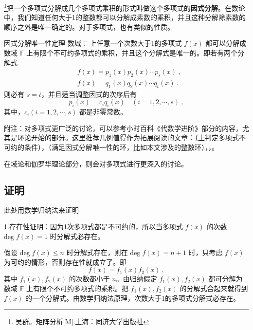 
\footnote{吴群。矩阵分析[M].上海：同济大学出版社}把一个多项式分解成几个多项式乘积的形式叫做这个多项式的\textbf{因式分解}。在数论中，我们知道任何大于1的整数都可以分解成素数的乘积，并且这种分解除素数的顺序之外是唯一确定的。对于多项式，也有类似的性质。
\begin{theorem}{因式分解唯一性定理}
数域 $\mathbb{F}$ 上任意一个次数大于1的多项式 $f(x)$ 都可以分解成数域 $\mathbb{F}$ 上有限个不可约多项式的乘积，并且这个分解式是唯一的。即若有两个分解式
 \begin{equation}
 \begin{aligned}
 &f(x)=p_1(x)p_2(x)\cdots p_s(x)~,\\
 &f(x)=q_1(x)q_2(x)\cdots q_t(x)~.
 \end{aligned}
 \end{equation}
 则必有 $s=t$，并且适当调整因式的次序后有
 \begin{equation}
 p_i(x)=c_iq_i(x)\quad (i=1,2,\cdots,s)~,
 \end{equation}
 其中，$c_i(i=1,2,\cdots,s)$ 都是非零常数。
\end{theorem}


附注：对多项式更广泛的讨论，可以参考小时百科《代数学进阶》部分的内容，尤其是环论开始的部分。这里推荐几例值得作为拓展阅读的文章：（上判定多项式不可约的条件），（满足因式分解唯一性的环，比如本文涉及的整数环），，。

在域论和伽罗华理论部分，则会对多项式进行更深入的讨论。


\subsection{证明}此处用数学归纳法来证明

1.存在性证明：因为1次多项式都是不可约的，所以当多项式 $f(x)$ 的次数 $\mathrm{deg}\;f(x)=1$ 时分解式必存在。

假设 $\mathrm{deg}\;f(x)\leq n$ 时分解式存在，则在 $\mathrm{deg}\;f(x)=n+1$ 时，只考虑 $f(x)$ 为可约的情形，否则存在性就成立了。即
\begin{equation}
f(x)=f_1(x)f_2(x)~,
\end{equation}
其中 $f_1(x),f_2(x)$ 的次数都小于 $n$。由归纳假定 $f_1(x),f_2(x)$ 都可分解为数域 $\mathbb{F}$ 上有限个不可约多项式的乘积。把 $f_1(x),f_2(x)$ 的分解式合起来就得到 $f(x)$ 的一个分解式。由数学归纳法原理，次数大于1的多项式分解式必存在。


